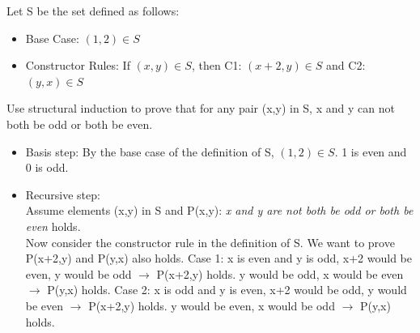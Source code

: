 \documentclass[solution, letterpaper]{cs20exam}
\begin{document}
Let S be the set defined as follows:
\begin{itemize}
\item Base Case: $(1,2) \in S$
\item Constructor Rules: If $(x,y)\in S$, then C1: $(x+2, y) \in S$ and C2: $(y,x) \in S$ 
\end{itemize}
Use structural induction to prove that for any pair (x,y) in S, x and y can not both be odd or both be even. 

\begin{solution}
\begin{itemize}
\item Basis step: By the base case of the definition of S, $(1,2)\in S$. 1 is even and 0 is odd.
\item Recursive step: \\
Assume elements (x,y) in S and P(x,y): \textit{x and y are not both be odd or both be even} holds. \\
Now consider the constructor rule in the definition of S.  We want to prove P(x+2,y) and P(y,x) also holds.
\subitem Case 1:  x is even and y is odd,
		\subsubitem x+2 would be even, y would be odd $\rightarrow$ P(x+2,y) holds.
		\subsubitem y would be odd, x would be even $\rightarrow$ P(y,x) holds.
\subitem Case 2:  x is odd and y is even,
		\subsubitem x+2 would be odd, y would be even $\rightarrow$ P(x+2,y) holds.
		\subsubitem y would be even, x would be odd $\rightarrow$ P(y,x) holds.
\end{itemize}
\end{solution}
\end{document}

